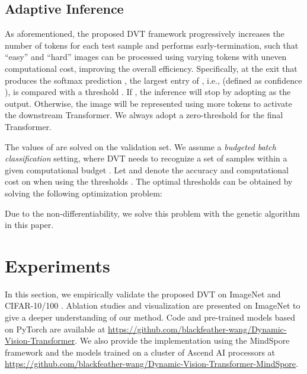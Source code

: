 \documentclass{article}
\begin{document}
\subsection{Adaptive Inference}
\vspace{-1ex}
\label{sec:adaptive_inference}

As aforementioned, the proposed DVT framework progressively increases the number of tokens for each test sample and performs early-termination, such that ``easy'' and ``hard'' images can be processed using varying tokens with uneven computational cost, improving the overall efficiency. Specifically, at the  exit that produces the softmax prediction , the largest entry of , i.e.,  (defined as confidence \cite{huang2017multi, yang2020resolution, NeurIPS2020_7866}), is compared with a threshold . If , the inference will stop by adopting  as the output. Otherwise, the image will be represented using more tokens to activate the downstream Transformer. We always adopt a zero-threshold for the final Transformer.

The values of  are solved on the validation set. We assume a \emph{budgeted batch classification} \cite{huang2017multi} setting, where DVT needs to recognize a set of samples  within a given computational budget . Let  and  denote the accuracy and computational cost on  when using the thresholds . The optimal thresholds can be obtained by solving the following optimization problem:

Due to the non-differentiability, we solve this problem with the genetic algorithm \cite{whitley1994genetic} in this paper.




















%
 




\vspace{-1.5ex}
\section{Experiments}
\vspace{-1.5ex}
\label{sec:experiment}

In this section, we empirically validate the proposed DVT on ImageNet \cite{5206848} and CIFAR-10/100 \cite{krizhevsky2009learning}. Ablation studies and visualization are presented on ImageNet to give a deeper understanding of our method. Code and pre-trained models based on PyTorch are available at \url{https://github.com/blackfeather-wang/Dynamic-Vision-Transformer}. We also provide the implementation using the MindSpore framework and the models trained on a cluster of Ascend AI processors at \url{https://github.com/blackfeather-wang/Dynamic-Vision-Transformer-MindSpore}.
\end{document}
